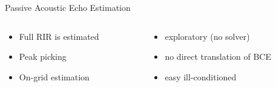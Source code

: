 \begin{frame}[t]{Passive Acoustic Echo Estimation \hfill\faPalette}
\begin{columns}[onlytextwidth]
            \begin{column}{.48\textwidth}
                \begin{itemize}
                    \item Full RIR is estimated
                    \item Peak picking
                    \item On-grid estimation %
                \end{itemize}
            \end{column}
            \begin{column}{.48\textwidth}
                \begin{itemize}
                    \item[\faWpexplorer] exploratory (no solver)
                    \item[\faLanguage] no direct translation of BCE
                    \item easy ill-conditioned
                \end{itemize}
            \end{column}%
        \end{columns}

\end{frame}

